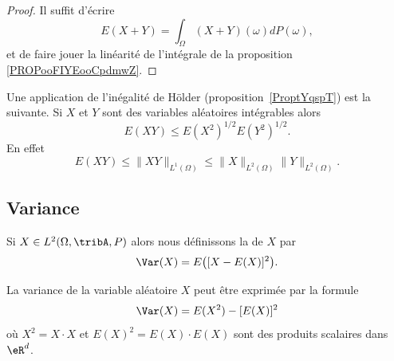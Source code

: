 \begin{proof}
	Il suffit d'écrire
	\begin{equation}
		E(X+Y)=\int_{\Omega}(X+Y)(\omega)dP(\omega),
	\end{equation}
	et de faire jouer la linéarité de l'intégrale de la proposition \ref{PROPooFIYEooCpdmwZ}.
\end{proof}

Une application de l'inégalité de Hölder (proposition~\ref{ProptYqspT}) est la suivante. Si \( X\) et \( Y\) sont des variables aléatoires intégrables alors
\begin{equation}
	E(XY)\leq E(X^2)^{1/2}E(Y^2)^{1/2}.
\end{equation}
En effet
\begin{equation}    \label{EqEXYleqXdYdNormHolder}
	E(XY)\leq \| XY \|_{L^1(\Omega)}\leq \| X \|_{L^2(\Omega)}\| Y \|_{L^2(\Omega)}.
\end{equation}

\subsection{Variance}

\begin{definition}[Variance]	\label{DEFooBHQOooVzpsob}
	Si \( X\in L^2(\Omega,\tribA,P)\) alors nous définissons la  de \( X\) par
	\begin{equation}
		\Var(X)=E\big( [X-E(X)]^2 \big).
	\end{equation}
\end{definition}

\begin{proposition}     \label{PrropVarAlterfrom}
	La variance de la variable aléatoire \( X\) peut être exprimée par la formule
	\begin{equation}        \label{EqtWqMGB}
		\Var(X)=E(X^2)-[E(X)]^2
	\end{equation}
	où \( X^2=X\cdot X\) et \( E(X)^2=E(X)\cdot E(X)\) sont des produits scalaires dans \( \eR^d\).
\end{proposition}

